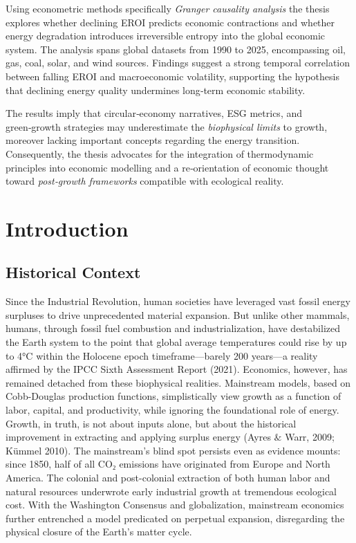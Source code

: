 \documentclass[a4paper,12pt]{article}
\begin{document}
Using econometric methods specifically \textit{Granger causality analysis} the thesis explores whether declining EROI predicts economic contractions and whether energy degradation introduces irreversible entropy into the global economic system. The analysis spans global datasets from 1990 to 2025, encompassing oil, gas, coal, solar, and wind sources. Findings suggest a strong temporal correlation between falling EROI and macroeconomic volatility, supporting the hypothesis that declining energy quality undermines long‑term economic stability.

The results imply that circular‑economy narratives, ESG metrics, and green‑growth strategies may underestimate the \textit{biophysical limits} to growth, moreover lacking important concepts regarding the energy transition. Consequently, the thesis advocates for the integration of thermodynamic principles into economic modelling and a re‑orientation of economic thought toward \textit{post‑growth frameworks} compatible with ecological reality.

\section{Introduction}

\subsection{Historical Context}
Since the Industrial Revolution, human societies have leveraged vast fossil energy surpluses to drive unprecedented material expansion. But unlike other mammals, humans, through fossil fuel combustion and industrialization, have destabilized the Earth system to the point that global average temperatures could rise by up to 4°C within the Holocene epoch timeframe—barely 200 years—a reality affirmed by the IPCC Sixth Assessment Report (2021).
Economics, however, has remained detached from these biophysical realities.
Mainstream models, based on Cobb-Douglas production functions, simplistically view growth as a function of labor, capital, and productivity, while ignoring the foundational role of energy. Growth, in truth, is not about inputs alone, but about the historical improvement in extracting and applying surplus energy (Ayres $\&$ Warr, 2009; Kümmel 2010).
The mainstream’s blind spot persists even as evidence mounts: since 1850, half of all CO₂ emissions have originated from Europe and North America. The colonial and post-colonial extraction of both human labor and natural resources underwrote early industrial growth at tremendous ecological cost.
With the Washington Consensus and globalization, mainstream economics further entrenched a model predicated on perpetual expansion, disregarding the physical closure of the Earth’s matter cycle.
\end{document}
